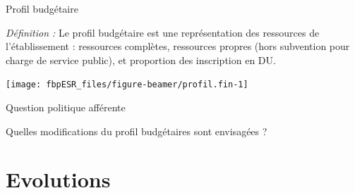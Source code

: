 \documentclass[
  8pt,
  french,
  ignorenonframetext,
  landscape]{beamer}
\begin{document}
\begin{frame}{Profil budgétaire}
\protect\hypertarget{profil-budguxe9taire}{}

\emph{Définition :} Le profil budgétaire est une représentation des
ressources de l'établissement : ressources complètes, ressources propres
(hors subvention pour charge de service public), et proportion des
inscription en DU.

\begin{center}\texttt{[image: fbpESR\_files/figure-beamer/profil.fin-1]} \end{center}

\begin{block}{Question politique afférente}

Quelles modifications du profil budgétaires sont envisagées ?

\end{block}

\end{frame}

\hypertarget{evolutions}{%
\section{Evolutions}\label{evolutions}}
\end{document}
